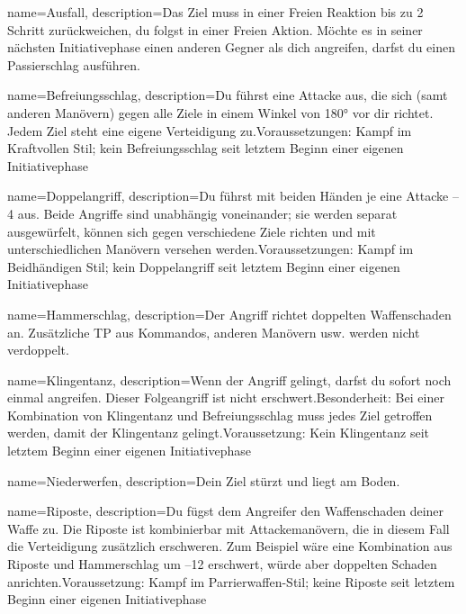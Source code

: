 {
    name={Ausfall},
    description={Das Ziel muss in einer Freien Reaktion bis zu 2 Schritt zurückweichen, du folgst in einer Freien Aktion. Möchte es in seiner nächsten Initiativephase einen anderen Gegner als dich angreifen, darfst du einen Passierschlag ausführen.}
}


{
    name={Befreiungsschlag},
    description={Du führst eine Attacke aus, die sich (samt anderen Manövern) gegen alle Ziele in einem Winkel von 180° vor dir richtet. Jedem Ziel steht eine eigene Verteidigung zu.\newline Voraussetzungen: Kampf im Kraftvollen Stil; kein Befreiungsschlag seit letztem Beginn einer eigenen Initiativephase}
}


{
    name={Doppelangriff},
    description={Du führst mit beiden Händen je eine Attacke –4 aus. Beide Angriffe sind unabhängig voneinander; sie werden separat ausgewürfelt, können sich gegen verschiedene Ziele richten und mit unterschiedlichen Manövern versehen werden.\newline Voraussetzungen: Kampf im Beidhändigen Stil; kein Doppelangriff seit letztem Beginn einer eigenen Initiativephase}
}


{
    name={Hammerschlag},
    description={Der Angriff richtet doppelten Waffenschaden an. Zusätzliche TP aus Kommandos, anderen Manövern usw. werden nicht verdoppelt.}
}


{
    name={Klingentanz},
    description={Wenn der Angriff gelingt, darfst du sofort noch einmal angreifen. Dieser Folgeangriff ist nicht erschwert.\newline Besonderheit: Bei einer Kombination von Klingentanz und Befreiungsschlag muss jedes Ziel getroffen werden, damit der Klingentanz gelingt.\newline Voraussetzung: Kein Klingentanz seit letztem Beginn einer eigenen Initiativephase}
}


{
    name={Niederwerfen},
    description={Dein Ziel stürzt und liegt am Boden.}
}


{
    name={Riposte},
    description={Du fügst dem Angreifer den Waffenschaden deiner Waffe zu. Die Riposte ist kombinierbar mit Attackemanövern, die in diesem Fall die Verteidigung zusätzlich erschweren. Zum Beispiel wäre eine Kombination aus Riposte und Hammerschlag um –12 erschwert, würde aber doppelten Schaden anrichten.\newline Voraussetzung: Kampf im Parrierwaffen-Stil; keine Riposte seit letztem Beginn einer eigenen Initiativephase}
}


